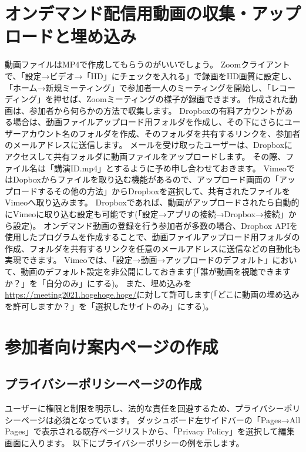 \documentclass[titlepage,10pt,a4paper,uplatex]{jsbook}
\begin{document}
\section{オンデマンド配信用動画の収集・アップロードと埋め込み}

動画ファイルはMP4で作成してもらうのがいいでしょう。
Zoomクライアントで、「設定→ビデオ→「HD」にチェックを入れる」で録画をHD画質に設定し、「ホーム→新規ミーティング」で参加者一人のミーティングを開始し、「レコーディング」を押せば、Zoomミーティングの様子が録画できます。
作成された動画は、参加者から何らかの方法で収集します。
Dropboxの有料アカウントがある場合は、動画ファイルアップロード用フォルダを作成し、その下にさらにユーザーアカウント名のフォルダを作成、そのフォルダを共有するリンクを、参加者のメールアドレスに送信します。
メールを受け取ったユーザーは、Dropboxにアクセスして共有フォルダに動画ファイルをアップロードします。
その際、ファイル名は「講演ID.mp4」とするように予め申し合わせておきます。
VimeoではDopboxからファイルを取り込む機能があるので、アップロード画面の「アップロードするその他の方法」からDropboxを選択して、共有されたファイルをVimeoへ取り込みます。
Dropboxであれば、動画がアップロードされたら自動的にVimeoに取り込む設定も可能です(「設定→アプリの接続→Dropbox→接続」から設定)。
オンデマンド動画の登録を行う参加者が多数の場合、Dropbox APIを使用したプログラムを作成することで、動画ファイルアップロード用フォルダの作成、フォルダを共有するリンクを任意のメールアドレスに送信などの自動化も実現できます。
Vimeoでは、「設定→動画→アップロードのデフォルト」において、動画のデフォルト設定を非公開にしておきます(「誰が動画を視聴できますか？」を「自分のみ」にする)。
また、埋め込みを\url{https://meeting2021.hogehoge.hoge/}に対して許可します(「どこに動画の埋め込みを許可しますか？」を「選択したサイトのみ」にする)。

\section{参加者向け案内ページの作成}

\subsection{プライバシーポリシーページの作成}

ユーザーに権限と制限を明示し、法的な責任を回避するため、プライバシーポリシーページは必須となっています。
ダッシュボード左サイドバーの「Pages→All Pages」で表示される既存ページリストから、「Privacy Policy」を選択して編集画面に入ります。
以下にプライバシーポリシーの例を示します。
\end{document}
